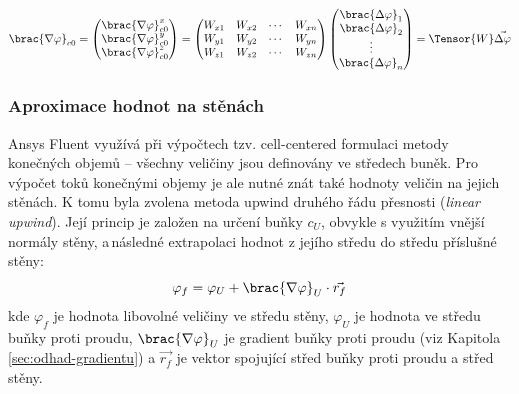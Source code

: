             \begin{equation}
                \brac{\nabla \varphi} _{c0} = \begin{pmatrix}
                    \brac{\nabla \varphi} _{c0} ^x \\
                    \brac{\nabla \varphi} _{c0} ^y \\
                    \brac{\nabla \varphi} _{c0} ^z 
                \end{pmatrix} = \begin{pmatrix}
                    W_{x1} & W_{x2} & \cdots & W_{xn} \\
                    W_{y1} & W_{y2} & \cdots & W_{yn} \\
                    W_{z1} & W_{z2} & \cdots & W_{zn} 
                \end{pmatrix} \begin{pmatrix}
                    \brac{\Delta \varphi} _1 \\
                    \brac{\Delta \varphi} _2 \\
                    \vdots \\
                    \brac{\Delta \varphi} _n
                \end{pmatrix} = \Tensor{W} \Vec{\Delta \varphi}
            \end{equation}
        \subsubsection{Aproximace hodnot na stěnách}
            Ansys Fluent využívá při výpočtech tzv. cell-centered formulaci metody konečných objemů – všechny veličiny jsou definovány ve středech buněk. Pro výpočet toků konečnými objemy je ale nutné znát také hodnoty veličin na jejich stěnách. K tomu byla zvolena metoda upwind druhého řádu přesnosti (\textit{linear upwind}). Její princip je založen na určení buňky  $c _U$, obvykle s využitím vnější normály stěny, a\,následné extrapolaci hodnot z jejího středu do středu příslušné stěny:
            \begin{equation}
                \varphi _{f} = \varphi _U + \brac{\nabla \varphi} _U \cdot \Vec{r _f}
            \end{equation}
            \noindent kde $\varphi _f$ je hodnota libovolné veličiny ve středu stěny, $\varphi _U$ je hodnota ve středu buňky proti proudu, $\brac{\nabla \varphi} _U$ je gradient buňky proti proudu (viz Kapitola \ref{sec:odhad-gradientu}) a $\Vec{r_f}$ je vektor spojující střed buňky proti proudu a střed stěny.


